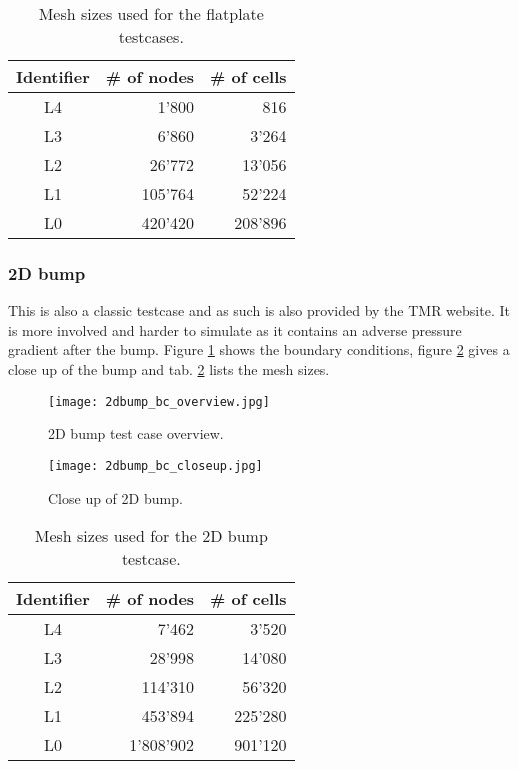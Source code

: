 \begin{table}[H]
    \centering
    \begin{tabular}{c r r}
        \toprule
        Identifier      & \# of nodes   & \# of cells \\
        \midrule
        L4              & 1'800         & 816 \\
        L3              & 6'860         & 3'264 \\
        L2              & 26'772        & 13'056 \\
        L1              & 105'764       & 52'224 \\
        L0              & 420'420       & 208'896 \\
        \bottomrule
    \end{tabular}
    \caption{Mesh sizes used for the flatplate testcases.}
    \label{tab:plate_mesh_sizes}
\end{table}


\subsubsection{2D bump}
This is also a classic testcase and as such is also provided by the TMR
website. It is more involved and harder to simulate as it contains an adverse
pressure gradient after the bump. Figure \ref{fig:2dbump_bc} shows the boundary
conditions, figure \ref{fig:2dbump_closeup} gives a close up of the bump and
tab. \ref{tab:2dbump_mesh_sizes} lists the mesh sizes.

\begin{figure}[H] \centering
    \texttt{[image: 2dbump\_bc\_overview.jpg]}
    \caption{2D bump test case overview. \cite{nasatmr}}
    \label{fig:2dbump_bc}
\end{figure}

\begin{figure}[H] \centering
    \texttt{[image: 2dbump\_bc\_closeup.jpg]}
    \caption{Close up of 2D bump. \cite{nasatmr}}
    \label{fig:2dbump_closeup}
\end{figure}

\begin{table}[H]
    \centering
    \begin{tabular}{c r r}
        \toprule
        Identifier      & \# of nodes   & \# of cells \\
        \midrule
        L4              & 7'462         & 3'520 \\
        L3              & 28'998        & 14'080 \\
        L2              & 114'310       & 56'320\\
        L1              & 453'894       & 225'280 \\
        L0              & 1'808'902     & 901'120 \\
        \bottomrule
    \end{tabular}
    \caption{Mesh sizes used for the 2D bump testcase.}
    \label{tab:2dbump_mesh_sizes}
\end{table}




